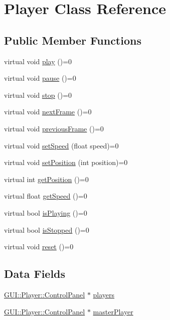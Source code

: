 \hypertarget{classGUI_1_1Player_1_1Player}{}\section{Player Class Reference}
\label{classGUI_1_1Player_1_1Player}
\subsection*{Public Member Functions}
\begin{DoxyCompactItemize}
\item 
virtual void \hyperlink{classGUI_1_1Player_1_1Player_aa3c4df4568ad2126665a07db4e1f59b6}{play} ()=0
\item 
virtual void \hyperlink{classGUI_1_1Player_1_1Player_a0edeed26c37624e7aa90f391c9a7128f}{pause} ()=0
\item 
virtual void \hyperlink{classGUI_1_1Player_1_1Player_a7a0e5d7c45657ca21b5b8d0d4b0a0e7b}{stop} ()=0
\item 
virtual void \hyperlink{classGUI_1_1Player_1_1Player_af64b0827c381fcd751fe2bbbf38682f4}{next\+Frame} ()=0
\item 
virtual void \hyperlink{classGUI_1_1Player_1_1Player_a4db6c8b8c8e9b567d466181337cdc001}{previous\+Frame} ()=0
\item 
virtual void \hyperlink{classGUI_1_1Player_1_1Player_a1c7d2ab9f6c21f2e7bf15a2ec9841a0a}{set\+Speed} (float speed)=0
\item 
virtual void \hyperlink{classGUI_1_1Player_1_1Player_acf5fb178b5d9a7f5f4bd198a13ae6bf7}{set\+Position} (int position)=0
\item 
virtual int \hyperlink{classGUI_1_1Player_1_1Player_a889dbfa5524d69dcc31d377d2d9bd230}{get\+Position} ()=0
\item 
virtual float \hyperlink{classGUI_1_1Player_1_1Player_a349fa93e666bd9fb256a238a3194f948}{get\+Speed} ()=0
\item 
virtual bool \hyperlink{classGUI_1_1Player_1_1Player_a4fbad8972dd248e6c8f5dc2c898a9bc7}{is\+Playing} ()=0
\item 
virtual bool \hyperlink{classGUI_1_1Player_1_1Player_ab9e7bd794ed42cea965c5250ec804225}{is\+Stopped} ()=0
\item 
virtual void \hyperlink{classGUI_1_1Player_1_1Player_a00af5c2c5e03cb5748a94d936fe34d9a}{reset} ()=0
\end{DoxyCompactItemize}
\subsection*{Data Fields}
\begin{DoxyCompactItemize}
\item 
\hyperlink{classGUI_1_1Player_1_1ControlPanel}{G\+U\+I\+::\+Player\+::\+Control\+Panel} $\ast$ \hyperlink{classGUI_1_1Player_1_1Player_ac801f4ed46e2463d545a348172613aee}{players}
\item 
\hyperlink{classGUI_1_1Player_1_1ControlPanel}{G\+U\+I\+::\+Player\+::\+Control\+Panel} $\ast$ \hyperlink{classGUI_1_1Player_1_1Player_a7ba93271801a919f4a134336bcac82dd}{master\+Player}
\end{DoxyCompactItemize}


